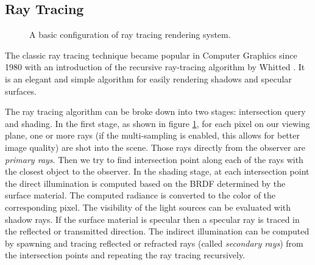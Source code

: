 \subsection{Ray Tracing}
\label{sec:mc_rt}

\begin{figure}[ht]
    \centering
    \renewcommand{\thefigure}{\thechapter.\arabic{figure}}
    \caption[Ray Tracing System Configuration]{A basic configuration of ray tracing rendering system.}
    \label{fig:ray_tracing}
\end{figure}

The classic ray tracing technique became popular in Computer Graphics since 1980 with an introduction of the recursive ray-tracing algorithm by Whitted \cite{Whitted1980}. It is an elegant and simple algorithm for easily rendering shadows and specular surfaces.

The ray tracing algorithm can be broke down into two stages: intersection query and shading. In the first stage, as shown in figure \ref{fig:ray_tracing}, for each pixel on our viewing plane, one or more rays (if the multi-sampling is enabled, this allows for better image quality) are shot into the scene. Those rays directly from the observer are \emph{primary rays}. Then we try to find intersection point along each of the rays with the closest object to the observer. In the shading stage, at each intersection point the direct illumination is computed based on the BRDF determined by the surface material. The computed radiance is converted to the color of the corresponding pixel. The visibility of the light sources can be evaluated with shadow rays.
If the surface material is specular then a specular ray is traced in the reflected or transmitted direction. The indirect illumination can be computed by spawning and tracing reflected or refracted rays (called \emph{secondary rays}) from the intersection points and repeating the ray tracing recursively.

